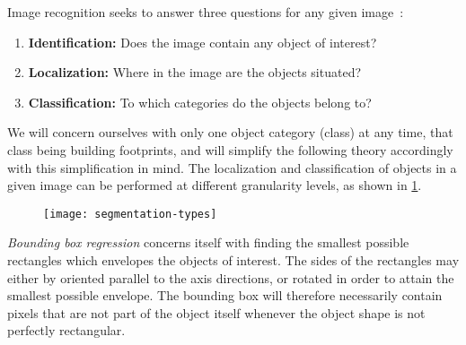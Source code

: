 Image recognition seeks to answer three questions for any given image~\cite{image_recognition}:

\begin{enumerate}[]
  \item \textbf{Identification:} Does the image contain any object of interest?
  \item \textbf{Localization:} Where in the image are the objects situated?
  \item \textbf{Classification:} To which categories do the objects belong to?
\end{enumerate}

We will concern ourselves with only one object category (class) at any time, that class being building footprints, and will simplify the following theory accordingly with this simplification in mind.
The localization and classification of objects in a given image can be performed at different granularity levels, as shown in \cref{fig:segmentation-types}.

\begin{figure}[htb]
  \texttt{[image: segmentation-types]}
  \label{fig:segmentation-types}
\end{figure}

\textit{Bounding box regression} concerns itself with finding the smallest possible rectangles which envelopes the objects of interest.
The sides of the rectangles may either by oriented parallel to the axis directions, or rotated in order to attain the smallest possible envelope.
The bounding box will therefore necessarily contain pixels that are not part of the object itself whenever the object shape is not perfectly rectangular.

